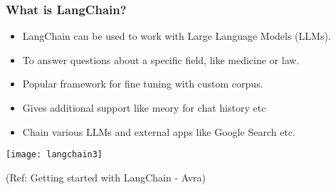 \begin{frame}\frametitle{What is LangChain?}

\begin{itemize}
\item LangChain can be used to work with Large Language Models (LLMs). 
\item To answer questions about a specific field, like medicine or law. 
\item Popular framework for fine tuning with custom corpus.
\item Gives additional support like meory for chat history etc
\item Chain various LLMs and external apps like Google Search etc.
\end{itemize}

\begin{center}
\texttt{[image: langchain3]}
\end{center}	  


{\tiny (Ref: Getting started with LangChain - Avra)}
\end{frame}


